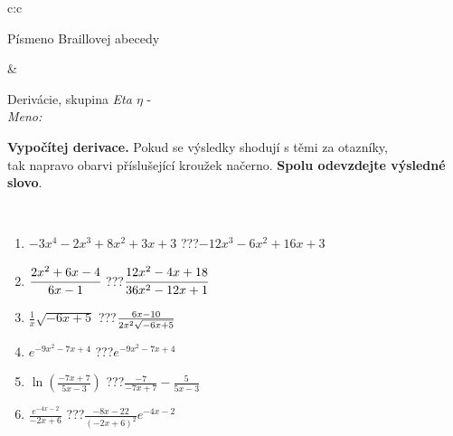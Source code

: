 \documentclass[10pt]{report}
\begin{document}
\begin{tabular}{c:c}
\begin{minipage}[c][104.5mm][t]{0.5\linewidth}
\begin{center}
\begin{minipage}{0.20\linewidth}
\begin{center}
{\small Písmeno Braillovej abecedy}
\end{center}
\end{minipage}
\end{center}
\end{minipage}
&
\begin{minipage}[c][104.5mm][t]{0.5\linewidth}
\begin{center}
\vspace{7mm}
{\huge Derivácie, skupina \textit{Eta $\eta$} -}\\[5mm]
\textit{Meno:}\phantom{xxxxxxxxxxxxxxxxxxxxxxxxxxxxxxxxxxxxxxxxxxxxxxxxxxxxxxxxxxxxxxxxx}\\[5mm]
\begin{minipage}{0.95\linewidth}
\begin{center}
\textbf{Vypočítej derivace.} Pokud se výsledky shodují s těmi za otazníky,\\tak napravo obarvi příslušející kroužek načerno. \textbf{Spolu odevzdejte výsledné slovo}.
\end{center}
\end{minipage}
\\[1mm]
\begin{minipage}{0.79\linewidth}
\begin{center}
\begin{varwidth}{\linewidth}
\begin{enumerate}
\normalsize
\item $-3x^4-2x^3+8x^2+3x+3$\quad \dotfill\; ???\;\dotfill \quad $-12x^3-6x^2+16x+3$
\item $\cfrac{2x^2+6x-4}{6x-1}$\quad \dotfill\; ???\;\dotfill \quad $\cfrac{12x^2-4x+18}{36x^2-12x+1}$
\item $\frac{1}{x}\sqrt{-6x+5}$\quad \dotfill\; ???\;\dotfill \quad $\frac{6x-10}{2x^2 \sqrt{\smash[b]{-6x+5}}}$
\item $e^{-9x^2-7x+4}$\quad \dotfill\; ???\;\dotfill \quad $e^{-9x^2-7x+4}$
\item $\ln{\left(\frac{-7x+7}{5x-3}\right)}$\quad \dotfill\; ???\;\dotfill \quad $\frac{-7}{-7x+7}-\frac{5}{5x-3}$
\item $\frac{e^{-4x-2}}{-2x+6}$\quad \dotfill\; ???\;\dotfill \quad $\frac{-8x-22}{(-2x+6)^2}e^{-4x-2}$
\end{enumerate}
\end{varwidth}
\end{center}
\end{minipage}
\begin{minipage}{0.20\linewidth}
\begin{center}

\end{center}
\end{minipage}
\end{center}
\end{minipage}
\end{tabular}
\end{document}

